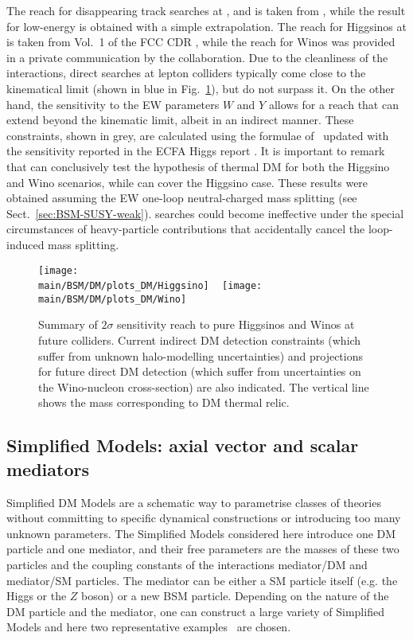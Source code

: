 \documentclass[../report.tex]{subfiles}
\providecommand{\main}{..}
\begin{document}
The reach for disappearing track searches at \HLLHC, \HELHC and \FCChh is taken from \cite{CidVidal:2018eel}, while the result for low-energy \FCChh is obtained with a simple extrapolation. The reach for Higgsinos at \FCCeh is taken from Vol.~1 of the FCC CDR \cite{Abada:2019lih}, while the \FCCeh reach for Winos was provided in a private communication by the  collaboration. Due to the cleanliness of the interactions, direct searches at lepton colliders typically come close to the kinematical limit (shown in blue in Fig.~\ref{fig:HiggsinoWino}), but do not surpass it.  On the other hand, the sensitivity to the EW parameters $W$ and $Y$ allows for a reach that can extend beyond the kinematic limit, albeit in an indirect manner.  These constraints, shown in grey, are calculated using the formulae of~\cite{DiLuzio:2018jwd} updated with the sensitivity reported in the ECFA Higgs report \cite{deBlas:2019rxi}. It is important to remark that \FCChh can conclusively test the hypothesis of thermal DM for both the Higgsino and Wino scenarios, while \CLIC can cover the Higgsino case. These results were obtained assuming the EW one-loop neutral-charged mass splitting (see Sect.~\ref{sec:BSM-SUSY-weak}). \FCChh searches could become ineffective under the special circumstances of heavy-particle contributions that accidentally cancel the loop-induced mass splitting.

\begin{figure}[htb]
    \centering
    \texttt{[image: \\main/BSM/DM/plots\_DM/Higgsino]}
   ~ \texttt{[image: \\main/BSM/DM/plots\_DM/Wino]}
    \caption{Summary of $2\sigma$ sensitivity reach to pure Higgsinos and Winos at future colliders. Current indirect DM detection constraints (which suffer from unknown halo-modelling uncertainties) and projections for future direct DM detection (which suffer from uncertainties on the Wino-nucleon cross-section) are also indicated. The vertical line shows the mass corresponding to DM thermal relic.}
    \label{fig:HiggsinoWino}
\end{figure}

\subsection{Simplified Models: axial vector and scalar mediators}

Simplified DM Models are a schematic way to parametrise classes of theories without committing to specific dynamical constructions or introducing too many unknown parameters. The Simplified Models considered here introduce one DM particle and one mediator, and their free parameters are the masses of these two particles and the coupling constants of the interactions mediator/DM and mediator/SM particles. The mediator can be either a SM particle itself (e.g. the Higgs or the $Z$ boson) or a new BSM particle. Depending on the nature of the DM particle and the mediator, one can construct a large variety of Simplified Models and here two representative examples~\cite{Abercrombie:2015wmb} are chosen.
\end{document}

